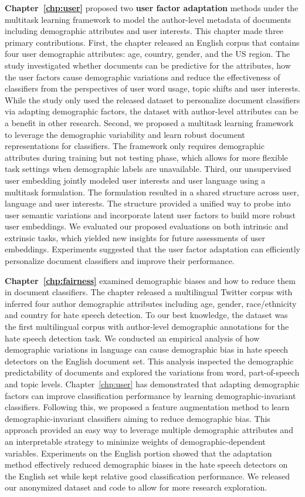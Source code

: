 \textbf{Chapter~\ref{chp:user}} proposed two \textbf{user factor adaptation} methods under the multitask learning framework to model the author-level metadata of documents including demographic attributes and user interests.
This chapter made three primary contributions. 
First, the chapter released an English corpus that contains four user demographic attributes: age, country, gender, and the US region. 
The study investigated whether documents can be predictive for the attributes, how the user factors cause demographic variations and reduce the effectiveness of classifiers from the perspectives of user word usage, topic shifts and user interests.
While the study only used the released dataset to personalize document classifiers via adapting demographic factors, the dataset with author-level attributes can be a benefit in other research.
Second, we proposed a multitask learning framework to leverage the demographic variability and learn robust document representations for classifiers. 
The framework only requires demographic attributes during training but not testing phase, which allows for more flexible task settings when demographic labels are unavailable. 
Third, our unsupervised user embedding jointly modeled user interests and user language using a multitask formulation.
The formulation resulted in a shared structure across user, language and user interests.
The structure provided a unified way to probe into user semantic variations and incorporate latent user factors to build more robust user embeddings. 
We evaluated our proposed evaluations on both intrinsic and extrinsic tasks, which yielded new insights for future assessments of user embeddings. 
Experiments suggested that the user factor adaptation can efficiently personalize document classifiers and improve their performance.

\textbf{Chapter~\ref{chp:fairness}} examined demographic biases and how to reduce them in document classifiers. 
The chapter released a multilingual Twitter corpus with inferred four author demographic attributes including age, gender, race/ethnicity and country for hate speech detection.
To our best knowledge, the dataset was the first multilingual corpus with author-level demographic annotations for the hate speech detection task. 
We conducted an empirical analysis of how demographic variations in language can cause demographic bias in hate speech detectors on the English document set.
This analysis inspected the demographic predictability of documents and explored the variations from word, part-of-speech and topic levels.
Chapter~\ref{chp:user} has demonstrated that adapting demographic factors can improve classification performance by learning demographic-invariant classifiers.
Following this, we proposed a feature augmentation method to learn demographic-invariant classifiers aiming to reduce demographic bias.
This approach provided an easy way to leverage multiple demographic attributes and an interpretable strategy to minimize weights of demographic-dependent variables. 
Experiments on the English portion showed that the adaptation method effectively reduced demographic biases in the hate speech detectors on the English set while kept relative good classification performance. 
We released our anonymized dataset and code to allow for more research exploration.


